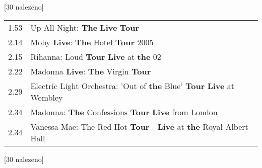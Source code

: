 \begin{table}[H]
\begin{tt}

\horizlina

\noindent
\begin{minipage}[t]{.5\textwidth}\vspace{0pt}
 [30 nalezeno]\vspace{5pt}

\begin{tabulary}{1.1\textwidth}{LL}
1.53 & Up All Night: {\color{red}\textbf{The}} {\color{red}\textbf{Live}} {\color{red}\textbf{Tour}} \\
2.14 & Moby {\color{red}\textbf{Live}}: {\color{red}\textbf{The}} Hotel {\color{red}\textbf{Tour}} 2005 \\
2.15 & Rihanna: Loud {\color{red}\textbf{Tour}} {\color{red}\textbf{Live}} at {\color{red}\textbf{the}} 02 \\
2.22 & Madonna {\color{red}\textbf{Live}}: {\color{red}\textbf{The}} Virgin {\color{red}\textbf{Tour}} \\
2.29 & Electric Light Orchestra: 'Out of {\color{red}\textbf{the}} Blue' {\color{red}\textbf{Tour}} {\color{red}\textbf{Live}} at Wembley \\
2.34 & Madonna: {\color{red}\textbf{The}} Confessions {\color{red}\textbf{Tour}} {\color{red}\textbf{Live}} from London \\
2.34 & Vanessa-Mae: {\color{red}The} Red Hot {\color{red}\textbf{Tour}} - {\color{red}\textbf{Live}} at {\color{red}\textbf{the}} Royal Albert Hall \\
\end{tabulary}
\end{minipage}
\begin{minipage}[t]{.5\textwidth}\vspace{0pt}
 [30 nalezeno]\vspace{5pt}


\end{minipage}
\end{tt}
\end{table}

